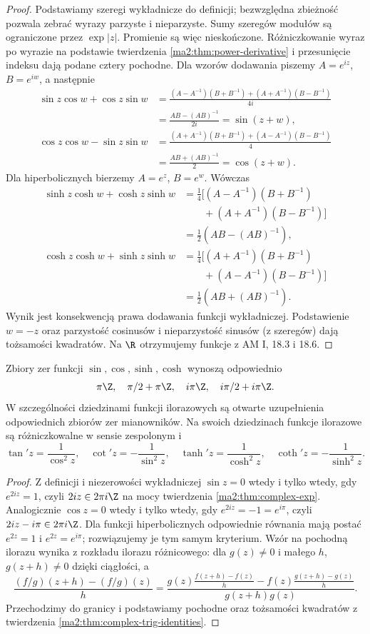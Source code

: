 \begin{proof}
Podstawiamy szeregi wykładnicze do definicji; bezwzględna
zbieżność pozwala zebrać wyrazy parzyste i nieparzyste. Sumy
szeregów modułów są ograniczone przez $\exp|z|$. Promienie są
więc nieskończone. Różniczkowanie wyraz po wyrazie na podstawie
twierdzenia \ref{ma2:thm:power-derivative} i przesunięcie indeksu
dają podane cztery pochodne. Dla wzorów dodawania piszemy
$A=e^{iz}$, $B=e^{iw}$, a następnie
\[
\begin{split}
 \sin z\cos w+\cos z\sin w
 &=\frac{(A-A^{-1})(B+B^{-1})+(A+A^{-1})(B-B^{-1})}{4i}\\
 &=\frac{AB-(AB)^{-1}}{2i}=\sin(z+w),\\
 \cos z\cos w-\sin z\sin w
 &=\frac{(A+A^{-1})(B+B^{-1})+(A-A^{-1})(B-B^{-1})}{4}\\
 &=\frac{AB+(AB)^{-1}}2=\cos(z+w).
\end{split}
\]
Dla hiperbolicznych bierzemy $A=e^z$, $B=e^w$. Wówczas
\begin{align*}
 \sinh z\cosh w+\cosh z\sinh w
 &=\tfrac14\big[(A-A^{-1})(B+B^{-1})\\
 &\qquad +(A+A^{-1})(B-B^{-1})\big]\\
 &=\tfrac12(AB-(AB)^{-1}),\\
 \cosh z\cosh w+\sinh z\sinh w
 &=\tfrac14\big[(A+A^{-1})(B+B^{-1})\\
 &\qquad +(A-A^{-1})(B-B^{-1})\big]\\
 &=\tfrac12(AB+(AB)^{-1}).
\end{align*} Wynik jest konsekwencją prawa dodawania
funkcji wykładniczej. Podstawienie $w=-z$ oraz parzystość
cosinusów i nieparzystość sinusów (z szeregów) dają tożsamości
kwadratów. Na $\R$ otrzymujemy funkcje z AM I, 18.3 i 18.6.
\end{proof}

\begin{twierdzenie}
\label{ma2:thm:complex-trig-zeros}
Zbiory zer funkcji $\sin,\cos,\sinh,\cosh$ wynoszą odpowiednio
\[
 \pi\Z,\quad \pi/2+\pi\Z,\quad i\pi\Z,\quad i\pi/2+i\pi\Z.
\]
W szczególności dziedzinami funkcji ilorazowych są otwarte
uzupełnienia odpowiednich zbiorów zer mianowników. Na swoich
dziedzinach funkcje ilorazowe są różniczkowalne
w sensie zespolonym i
\[
 \tan' z=\frac1{\cos^2z},\quad
 \cot' z=-\frac1{\sin^2z},\quad
 \tanh' z=\frac1{\cosh^2z},\quad
 \coth' z=-\frac1{\sinh^2z}.
\]
\end{twierdzenie}
\begin{proof}
Z definicji i niezerowości wykładniczej $\sin z=0$ wtedy i tylko
wtedy, gdy $e^{2iz}=1$, czyli $2iz\in2\pi i\Z$ na mocy
twierdzenia \ref{ma2:thm:complex-exp}. Analogicznie $\cos z=0$
wtedy i tylko wtedy, gdy $e^{2iz}=-1=e^{i\pi}$, czyli
$2iz-i\pi\in2\pi i\Z$. Dla funkcji hiperbolicznych odpowiednie
równania mają postać $e^{2z}=1$ i $e^{2z}=e^{i\pi}$;
rozwiązujemy je tym samym kryterium.
Wzór na pochodną ilorazu wynika z rozkładu ilorazu różnicowego:
dla $g(z)\ne0$ i małego $h$, $g(z+h)\ne0$ dzięki ciągłości,
a
\[
 \frac{(f/g)(z+h)-(f/g)(z)}{h}
 =\frac{g(z)\frac{f(z+h)-f(z)}h-f(z)\frac{g(z+h)-g(z)}h}
 {g(z+h)g(z)}.
\]
Przechodzimy do granicy i podstawiamy pochodne oraz tożsamości
kwadratów z twierdzenia \ref{ma2:thm:complex-trig-identities}.
\end{proof}

